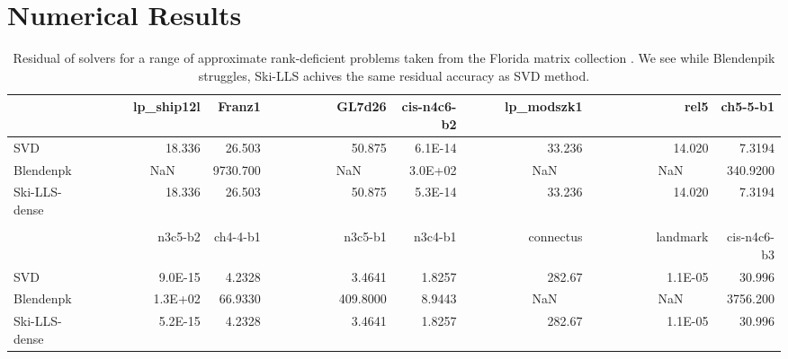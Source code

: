 \documentclass[english,11pt]{article}
\begin{document}
\section{Numerical Results}
\begin{table}[H]
\scriptsize
\centering
\begin{tabular}{l|rrrrrrr}
               & lp\_ship12l                          & Franz1               & GL7d26                                & cis-n4c6-b2          & lp\_modszk1                           & rel5                                  & ch5-5-b1              \\ 
\hline
SVD          & 18.336                               & 26.503               & 50.875                                & 6.1E-14              & 33.236                                & 14.020                                & 7.3194                \\
Blendenpk      & \multicolumn{1}{l}{~~~~~~~~~NaN~~~~} & 9730.700             & \multicolumn{1}{l}{~~~~~~~~~~NaN~~~~} & 3.0E+02              & \multicolumn{1}{l}{~~~~~~~~~~NaN~~~~} & \multicolumn{1}{l}{~~~~~~~~~~NaN~~~~} & 340.9200              \\
Ski-LLS-dense  & 18.336                               & 26.503               & 50.875                                & 5.3E-14              & 33.236                                & 14.020                                & 7.3194                \\
               & \multicolumn{1}{l}{}                 & \multicolumn{1}{l}{} & \multicolumn{1}{l}{}                  & \multicolumn{1}{l}{} & \multicolumn{1}{l}{}                  & \multicolumn{1}{l}{}                  & \multicolumn{1}{l}{}  \\
               & n3c5-b2                              & ch4-4-b1             & n3c5-b1                               & n3c4-b1              & connectus                             & landmark                              & cis-n4c6-b3           \\ 
\hline
SVD            & 9.0E-15                              & 4.2328               & 3.4641                                & 1.8257               & 282.67                                & 1.1E-05                               & 30.996                \\
Blendenpk      & 1.3E+02                              & 66.9330              & 409.8000                              & 8.9443               & \multicolumn{1}{l}{~~~~~~~~~~NaN~~~~} & \multicolumn{1}{l}{~~~~~~~~~~NaN~~~~} & 3756.200              \\
Ski-LLS-dense  & 5.2E-15                              & 4.2328               & 3.4641                                & 1.8257               & 282.67                                & 1.1E-05                               & 30.996               
\end{tabular}
\caption{Residual of solvers for a range of approximate rank-deficient problems taken from the Florida matrix collection \cite{10.1145/2049662.2049663}. We see while Blendenpik struggles, Ski-LLS achives the same residual accuracy as SVD method.}
\label{tab::rank_def_accuracy}
\end{table}
\end{document}
